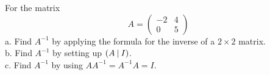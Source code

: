 \documentclass{ximera}
\begin{document}
\begin{exercise}
For the matrix
\[A= \left(\begin{array}{cc}
-2 & 4 \\
0 & 5
\end{array}\right)
\]
a. Find $A^{-1}$ by applying the formula for the inverse of a $2\times 2$ matrix.\\
b. Find $A^{-1}$ by setting up $(A \hspace{.08cm}|\hspace{.08cm} I)$. \\
c. Find $A^{-1}$ by using $AA^{-1}= A^{-1}A=I$. 
\end{exercise}
\end{document}
